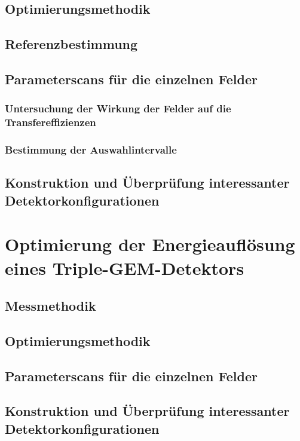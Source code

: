 	\section{Optimierungsmethodik}
	
	\section{Referenzbestimmung}
	
	\section{Parameterscans für die einzelnen Felder}
		\subsection{Untersuchung der Wirkung der Felder auf die Transfereffizienzen}
		
		\subsection{Bestimmung der Auswahlintervalle}
	
	\section{Konstruktion und Überprüfung interessanter Detektorkonfigurationen}



\chapter{Optimierung der Energieauflösung eines Triple-GEM-Detektors}
	\section{Messmethodik}
	
	\section{Optimierungsmethodik}
	
	\section{Parameterscans für die einzelnen Felder}
	
	\section{Konstruktion und Überprüfung interessanter Detektorkonfigurationen}
	
